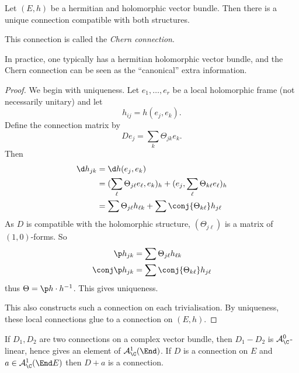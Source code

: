 \documentclass[a4paper]{article}
\begin{document}
\begin{proposition}
  Let \((E, h)\) be a hermitian and holomorphic vector bundle. Then there is a unique connection compatible with both structures.
\end{proposition}

\begin{definition}
  This connection is called the \emph{Chern connection}.
\end{definition}

\begin{remark}
  In practice, one typically has a hermitian holomorphic vector bundle, and the Chern connection can be seen as the ``canonical'' extra information.
\end{remark}

\begin{proof}
  We begin with uniqueness. Let \(e_1, \dots, e_r\) be a local holomorphic frame (not necessarily unitary) and let
  \[
    h_{ij} = h(e_j, e_k).
  \]
  Define the connection matrix by
  \[
    De_j = \sum_k \Theta_{jk} e_k.
  \]
  Then
  \begin{align*}
    \d h_{jk}
    &= \d h(e_j, e_k) \\
    &= (\sum_\ell \Theta_{j\ell} e_\ell, e_k)_h + (e_j, \sum_\ell \Theta_{k\ell} e_\ell)_h \\
    &= \sum \Theta_{j\ell} h_{\ell k} + \sum \conj{\Theta_{k\ell}} h_{j\ell}
  \end{align*}
  As \(D\) is compatible with the holomorphic structure, \((\Theta_{j\ell})\) is a matrix of \((1, 0)\)-forms. So
  \begin{align*}
    \p h_{jk} &= \sum \Theta_{j\ell} h_{\ell k} \\
    \conj \p h_{jk} &= \sum \conj{\Theta_{k\ell}} h_{j\ell}
  \end{align*}
  thus \(\Theta =  \p h \cdot h^{-1}\). This gives uniqueness.

  This also constructs such a connection on each trivialisation. By uniqueness, these local connections glue to a connection on \((E, h)\).
\end{proof}

\begin{lemma}
  If \(D_1, D_2\) are two connections on a complex vector bundle, then \(D_1 - D_2\) is \(\mathcal A_\C^0\)-linear, hence gives an element of \(\mathcal A^1_\C(\End)\). If \(D\) is a connection on \(E\) and \(a \in \mathcal A_\C^1(\End E)\) then \(D + a\) is a connection.
\end{lemma}
\end{document}
